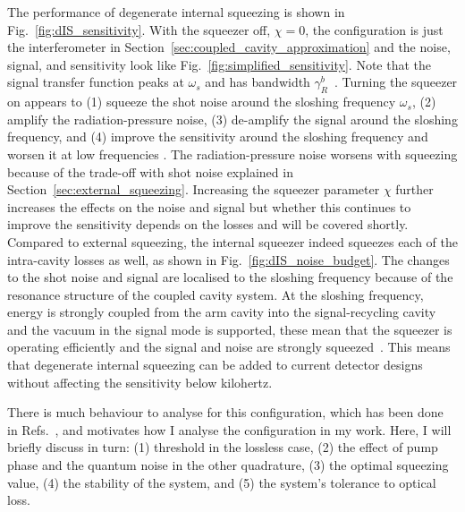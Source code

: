 The performance of degenerate internal squeezing is shown in Fig.~\ref{fig:dIS_sensitivity}. With the squeezer off, $\chi=0$, the configuration is just the interferometer in Section~\ref{sec:coupled_cavity_approximation} and the noise, signal, and sensitivity look like Fig.~\ref{fig:simplified_sensitivity}. Note that the signal transfer function peaks at $\omega_s$ and has bandwidth $\gamma^b_R$~\cite{}. Turning the squeezer on appears to (1) squeeze the shot noise around the sloshing frequency $\omega_s$, (2) amplify the radiation-pressure noise, (3) de-amplify the signal around the sloshing frequency, and (4) improve the sensitivity around the sloshing frequency and worsen it at low frequencies . The radiation-pressure noise worsens with squeezing  because of the trade-off with shot noise explained in Section~\ref{sec:external_squeezing}. Increasing the squeezer parameter $\chi$ further increases the effects on the noise and signal but whether this continues to improve the sensitivity depends on the losses and will be covered shortly. Compared to external squeezing, the internal squeezer indeed squeezes each of the intra-cavity losses as well, as shown in Fig.~\ref{fig:dIS_noise_budget}. 
The changes to the shot noise and signal are localised to the sloshing frequency because of the resonance structure of the coupled cavity system. At the sloshing frequency, energy is strongly coupled from the arm cavity into the signal-recycling cavity and the vacuum in the signal mode is supported, these mean that the squeezer is operating efficiently and the signal and noise are strongly squeezed~\cite{}.  This means that degenerate internal squeezing can be added to current detector designs without affecting the sensitivity below kilohertz.

There is much behaviour to analyse for this configuration, which has been done in Refs.~\cite{Korobko2019,Adya2020,Korobko}, and motivates how I analyse the configuration in my work. Here, I will briefly discuss in turn: (1) threshold in the lossless case, (2) the effect of pump phase and the quantum noise in the other quadrature, (3) the optimal squeezing value, (4) the stability of the system, and (5) the system's tolerance to optical loss.

